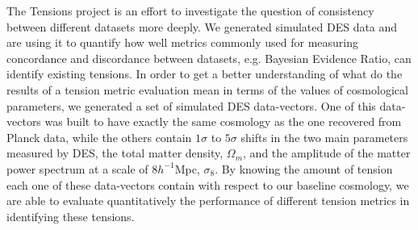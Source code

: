 \documentclass[12pt]{article}
\begin{document}
\begin{small}
The Tensions project is an effort to investigate the question of consistency between different datasets more deeply. We generated simulated DES data and are using it to quantify how well metrics commonly used for measuring concordance and discordance between datasets, e.g. Bayesian Evidence Ratio, can identify existing tensions. In order to get a better understanding of what do the results of a tension metric evaluation mean in terms of the values of cosmological parameters, we generated a set of simulated DES data-vectors. One of this data-vectors was built to have exactly the same cosmology as the one recovered from Planck data, while the others contain $1\sigma$ to $5\sigma$ shifts in the two main parameters measured by DES, the total matter density, $\Omega_m$, and the amplitude of the matter power spectrum at a scale of $8h^{-1}$Mpc, $\sigma_8$. By knowing the amount of tension each one of these data-vectors contain with respect to our baseline cosmology, we are able to evaluate quantitatively the performance of different tension metrics in identifying these tensions.




\end{small}
\end{document}
